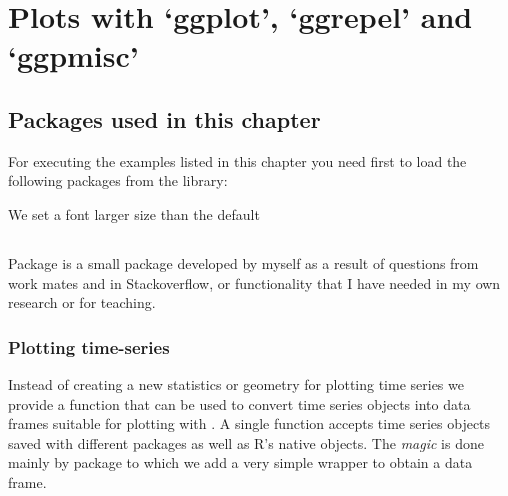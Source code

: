 \documentclass[paper=a4,10pt,div=17,headsepline,BCOR=12mm,twoside,open=right]{scrbook}\usepackage{knitr}
\begin{document}
\chapter[Plots with ggpplot, ggrepel and ggpmisc]{Plots with `ggplot', `ggrepel' and `ggpmisc'}\label{chap:R:plotting}

\section{Packages used in this chapter}

For executing the examples listed in this chapter you need first to load the following packages from the library:

\begin{knitrout}\footnotesize
{}\color{fgcolor}\begin{kframe}
\begin{alltt}
\end{alltt}
\end{kframe}
\end{knitrout}

We set a font larger size than the default
\begin{knitrout}\footnotesize
{}\color{fgcolor}\begin{kframe}
\begin{alltt}
\hlstd{(}\hlstd{(}\hlstd{))}
\end{alltt}
\end{kframe}
\end{knitrout}




\section[ggpmisc]{\ggpmisc}

Package \ggpmisc is a small package developed by myself as a result of questions from work mates and in Stackoverflow, or functionality that I have needed in my own research or for teaching.

\subsection{Plotting time-series}

Instead of creating a new statistics or geometry for plotting time series we provide a function that can be used to convert time series objects into data frames suitable for plotting with \ggplot. A single function  accepts time series objects saved with different packages as well as R's native  objects. The \textit{magic} is done mainly by package \xts to which we add a very simple wrapper to obtain a data frame.
\end{document}
